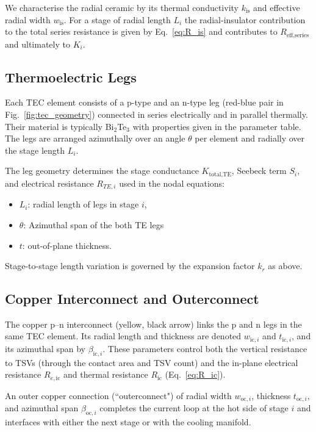 \documentclass[conference]{IEEEtran}
\begin{document}
We characterise the radial ceramic by its thermal conductivity $k_{\text{is}}$ and effective radial width $w_{\text{is}}$. For a stage of radial length $L_i$ the radial-insulator contribution to the total series resistance is given by Eq.~\eqref{eq:R_is} and contributes to $R_{\text{eff,series}}$ and ultimately to $K_i$.

\subsection{Thermoelectric Legs}

Each TEC element consists of a p-type and an n-type leg (red-blue pair in Fig.~\ref{fig:tec_geometry}) connected in 
series electrically and in parallel thermally. Their material is typically Bi$_2$Te$_3$ with properties given 
in the parameter table. The legs are arranged azimuthally over an angle $\theta$ per element and 
radially over the stage length $L_i$.

The leg geometry determines the stage conductance $K_{\text{total,TE}}$, Seebeck term $S_i$, 
and electrical resistance $R_{TE,i}$ used in the nodal equations:
\begin{itemize}
	\item $L_i$: radial length of legs in stage $i$,
	\item $\theta$: Azimuthal span of the both TE legs
	\item $t$: out-of-plane thickness.
\end{itemize}
Stage-to-stage length variation is governed by the expansion factor $k_r$ as above.

\subsection{Copper Interconnect and Outerconnect}

The copper p--n interconnect (yellow, black arrow) links the p and n legs in the same TEC element. Its radial length and thickness are denoted $w_{\text{ic},i}$ and $t_{\text{ic},i}$, and its azimuthal span by $\beta_{\text{ic},i}$. These parameters control both the vertical resistance to TSVs (through the contact area and TSV count) and the in-plane electrical resistance $R_{e,\text{ic}}$ and thermal resistance $R_{\text{ic}}$ (Eq.~\eqref{eq:R_ic}).

An outer copper connection (``outerconnect") of radial width $w_{\text{oc},i}$, thickness $t_{\text{oc},i}$, and azimuthal span $\beta_{\text{oc},i}$ completes the current loop at the hot side of stage $i$ and interfaces with either the next stage or with the cooling manifold.
\end{document}
